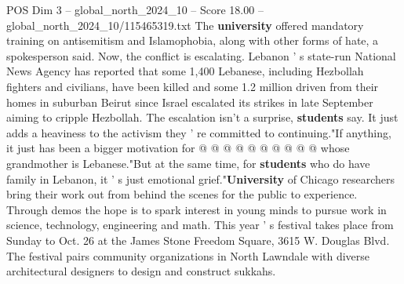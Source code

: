 \begin{textsample}{POS Dim 3 – global\_north\_2024\_10 – Score 18.00 – global\_north\_2024\_10/115465319.txt}
The \textbf{university} offered mandatory training on antisemitism and Islamophobia, along with other forms of hate, a spokesperson said.
Now, the conflict is escalating.
Lebanon ' s state-run National News Agency has reported that some 1,400 Lebanese, including Hezbollah fighters and civilians, have been killed and some 1.2 million driven from their homes in suburban Beirut since Israel escalated its strikes in late September aiming to cripple Hezbollah.
The escalation isn't a surprise, \textbf{students} say.
It just adds a heaviness to the activism they ' re committed to continuing."If anything, it just has been a bigger motivation for @ @ @ @ @ @ @ @ @ @ whose grandmother is Lebanese."But at the same time, for \textbf{students} who do have family in Lebanon, it ' s just emotional grief."\textbf{University} of Chicago researchers bring their work out from behind the scenes for the public to experience.
Through demos the hope is to spark interest in young minds to pursue work in science, technology, engineering and math.
This year ' s festival takes place from Sunday to Oct. 26 at the James Stone Freedom Square, 3615 W.
Douglas Blvd.
The festival pairs community organizations in North Lawndale with diverse architectural designers to design and construct sukkahs.

\end{textsample}
